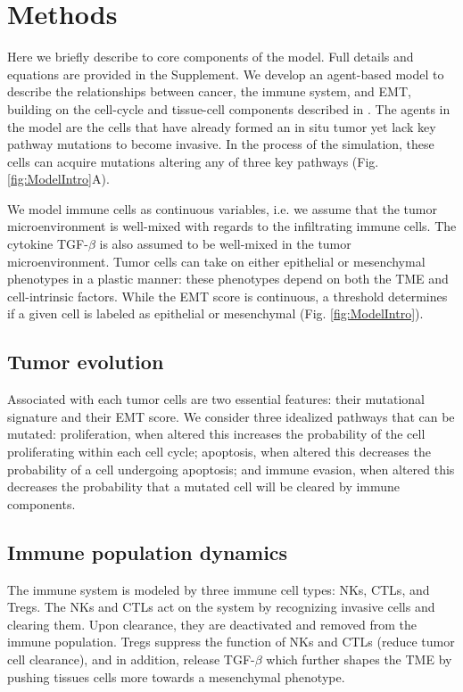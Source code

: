 \documentclass[11pt]{article}
\begin{document}
\section{Methods}
Here we briefly describe to core components of the model. Full details and equations are provided in the Supplement. We develop an agent-based model to describe the relationships between cancer, the immune system, and EMT, building on the cell-cycle and tissue-cell components described in \cite{guo17_multiscale}. 
The agents in the model are the cells that have already formed an in situ tumor yet lack key pathway mutations to become invasive.
In the process of the simulation, these cells can acquire mutations altering any of three key pathways (Fig. \ref{fig:ModelIntro}A).
\par
We model immune cells as continuous variables, i.e. we assume that the tumor microenvironment is well-mixed with regards to the infiltrating immune cells.
The cytokine TGF-$\beta$ is also assumed to be well-mixed in the tumor microenvironment.
Tumor cells can take on either epithelial or mesenchymal phenotypes in a plastic manner: these phenotypes depend on both the TME and cell-intrinsic factors.
While the EMT score is continuous, a threshold determines if a given cell is labeled as epithelial or mesenchymal (Fig. \ref{fig:ModelIntro}).

\subsection{Tumor evolution}\label{TissueCells}
Associated with each tumor cells are two essential features: their mutational signature and their EMT score. We consider three idealized pathways that can be mutated: proliferation, when altered this increases the probability of the cell proliferating within each cell cycle; apoptosis, when altered this decreases the probability of a cell undergoing apoptosis; and immune evasion, when altered this decreases the probability that a mutated cell will be cleared by immune components.
 
\subsection{Immune population dynamics}\label{ImmuneSystem}
The immune system is modeled by three immune cell types: NKs, CTLs, and Tregs.
The NKs and CTLs act on the system by recognizing invasive cells and clearing them.
Upon clearance, they are deactivated and removed from the immune population.
Tregs suppress the function of NKs and CTLs (reduce tumor cell clearance), and in addition, release TGF-$\beta$ which further shapes the TME by pushing tissues cells more towards a mesenchymal phenotype.
\end{document}
